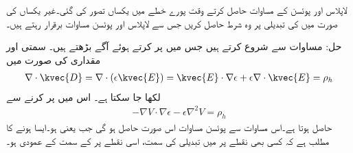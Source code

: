 لاپلاس اور پوئسن  کے مساوات حاصل کرتے وقت پورے خطے میں یکساں  تصور کی گئی۔غیر یکساں  کی صورت میں  کی تبدیلی پر وہ شرط حاصل کریں جس سے لاپلاس اور پوئسن مساوات برقرار رہتے ہیں۔

حل: مساوات  سے شروع کرتے ہیں جس میں  پر کرتے ہوئے آگے بڑھتے ہیں۔ سمتی  اور مقداری  کی صورت میں
\begin{align*}
\nabla \cdot \kvec{D}=\nabla \cdot (\epsilon \kvec{E})=\kvec{E} \cdot \nabla \epsilon+\epsilon \nabla \cdot \kvec{E}=\rho_h
\end{align*}
لکھا جا سکتا ہے۔  اس میں  پر کرنے سے
\begin{align*}
-\nabla V \cdot \nabla \epsilon-\epsilon \nabla^2 V=\rho_h
\end{align*}
حاصل ہوتا ہے۔اس مساوات سے پوئسن مساوات اس صورت حاصل ہو گی جب  یعنی  ہو۔ایسا ہونے کا مطلب ہے  کہ کسی بھی نقطے پر   میں تبدیلی کی سمت، اسی نقطے پر  کے سمت کے عمودی ہو۔ 

